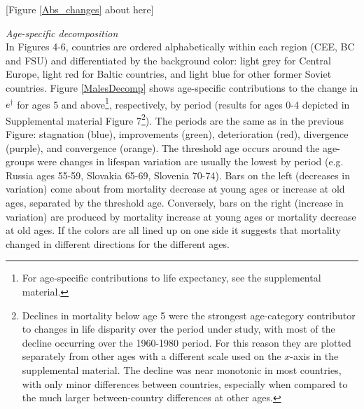 \documentclass{article}
\begin{document}
\begin{spacing}{1.5}
\begin{center}
[Figure \ref{Abs_changes} about here]
\end{center}

\emph{Age-specific decomposition}\\



In Figures 4-6, countries are ordered alphabetically within each region (CEE, BC and FSU) and differentiated by the background color: light grey for Central Europe, light red for Baltic countries, and light blue for other former Soviet countries. Figure  \ref{MalesDecomp} shows age-specific contributions to the change in $e^\dagger$ for ages 5 and above\footnote{For age-specific contributions to life expectancy, see the supplemental material.}, respectively, by period (results for ages 0-4 depicted in Supplemental material Figure 7\footnote{Declines in mortality below age 5 were the strongest age-category contributor to changes in life disparity over the period under study, with most of the decline occurring over the 1960-1980 period. For this reason they are plotted separately from other ages with a different scale used on the $x$-axis in the supplemental material. The decline was near monotonic in most countries, with only minor differences between countries, especially when compared to the much larger between-country differences at other ages.}). The periods are the same as in the previous Figure:  stagnation (blue), improvements (green), deterioration (red), divergence (purple), and convergence (orange). The threshold age occurs around the age-groups were changes in lifespan variation are usually the lowest by period (e.g. Russia ages 55-59, Slovakia 65-69, Slovenia 70-74). Bars on the left (decreases in variation) come about from mortality decrease at young ages or increase at old ages, separated by the threshold age. Conversely, bars on the right (increase in variation) are produced by mortality increase at young ages or mortality decrease at old ages. If the colors are all lined up on one side it suggests that mortality changed in different directions for the different ages. \\



\end{spacing}
\end{document}
